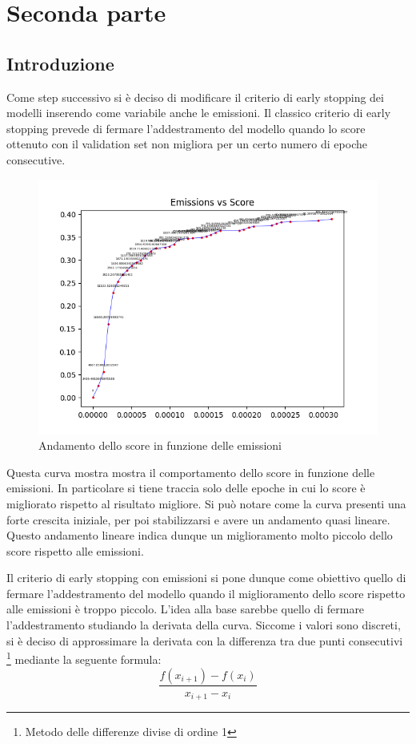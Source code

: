\section{Seconda parte}
\subsection{Introduzione}
Come step successivo si è deciso di modificare il criterio di early stopping dei modelli inserendo come variabile anche le emissioni.
Il classico criterio di early stopping prevede di fermare l'addestramento del modello quando lo score ottenuto con il validation set non migliora per un certo numero di epoche consecutive.


\begin{figure}[H]
    \centering
    \includegraphics[scale=1]{images/curve_emissions_score.png}
    \caption{Andamento dello score in funzione delle emissioni}
\end{figure}

\noindent Questa curva mostra mostra il comportamento dello score in funzione delle emissioni. In particolare si tiene traccia solo delle epoche in cui lo score è migliorato rispetto al risultato migliore.
Si può notare come la curva presenti una forte crescita iniziale, per poi stabilizzarsi e avere un andamento quasi lineare.
Questo andamento lineare indica dunque un miglioramento molto piccolo dello score rispetto alle emissioni.

\noindent Il criterio di early stopping con emissioni si pone dunque come obiettivo quello di fermare l'addestramento del modello quando il miglioramento dello score rispetto alle emissioni è troppo piccolo.
L'idea alla base sarebbe quello di fermare l'addestramento studiando la derivata della curva. Siccome i valori sono discreti, si è deciso di approssimare la derivata con la differenza tra due punti consecutivi \footnote{Metodo delle differenze divise di ordine 1}{} mediante la seguente formula:
\begin{equation}
    \frac{f(x_{i+1}) - f(x_i)}{x_{i+1} - x_i}
\end{equation}

